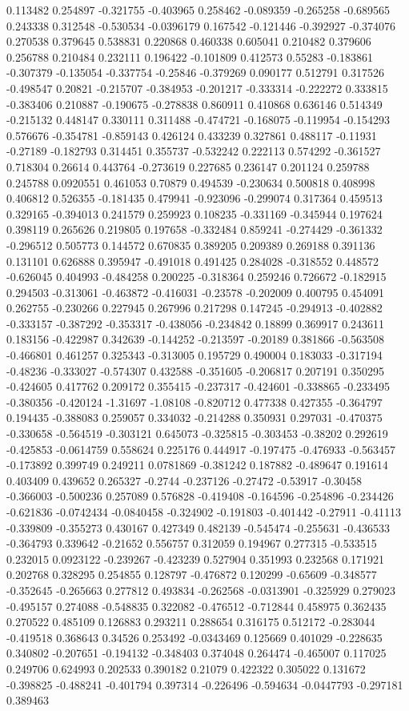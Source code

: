 0.113482 0.254897 -0.321755 -0.403965 0.258462 -0.089359 -0.265258 -0.689565 0.243338 0.312548 -0.530534 -0.0396179 0.167542 -0.121446 -0.392927 -0.374076 0.270538 0.379645 0.538831 0.220868 0.460338 0.605041 0.210482 0.379606 0.256788 0.210484 0.232111 0.196422 -0.101809 0.412573 0.55283 -0.183861 -0.307379 -0.135054 -0.337754 -0.25846 -0.379269 0.090177 0.512791 0.317526 -0.498547 0.20821 -0.215707 -0.384953 -0.201217 -0.333314 -0.222272 0.333815 -0.383406 0.210887 -0.190675 -0.278838 0.860911 0.410868 0.636146 0.514349 -0.215132 0.448147 0.330111 0.311488 -0.474721 -0.168075 -0.119954 -0.154293 0.576676 -0.354781 -0.859143 0.426124 0.433239 0.327861 0.488117 -0.11931 -0.27189 -0.182793 0.314451 0.355737 -0.532242 0.222113 0.574292 -0.361527 0.718304 0.26614 0.443764 -0.273619 0.227685 0.236147 0.201124 0.259788 0.245788 0.0920551 0.461053 0.70879 0.494539 -0.230634 0.500818 0.408998 0.406812 0.526355 -0.181435 0.479941 -0.923096 -0.299074 0.317364 0.459513 0.329165 -0.394013 0.241579 0.259923 0.108235 -0.331169 -0.345944 0.197624 0.398119 0.265626 0.219805 0.197658 -0.332484 0.859241 -0.274429 -0.361332 -0.296512 0.505773 0.144572 0.670835 0.389205 0.209389 0.269188 0.391136 0.131101 0.626888 0.395947 -0.491018 0.491425 0.284028 -0.318552 0.448572 -0.626045 0.404993 -0.484258 0.200225 -0.318364 0.259246 0.726672 -0.182915 0.294503 -0.313061 -0.463872 -0.416031 -0.23578 -0.202009 0.400795 0.454091 0.262755 -0.230266 0.227945 0.267996 0.217298 0.147245 -0.294913 -0.402882 -0.333157 -0.387292 -0.353317 -0.438056 -0.234842 0.18899 0.369917 0.243611 0.183156 -0.422987 0.342639 -0.144252 -0.213597 -0.20189 0.381866 -0.563508 -0.466801 0.461257 0.325343 -0.313005 0.195729 0.490004 0.183033 -0.317194 -0.48236 -0.333027 -0.574307 0.432588 -0.351605 -0.206817 0.207191 0.350295 -0.424605 0.417762 0.209172 0.355415 -0.237317 -0.424601 -0.338865 -0.233495 -0.380356 -0.420124 -1.31697 -1.08108 -0.820712 0.477338 0.427355 -0.364797 0.194435 -0.388083 0.259057 0.334032 -0.214288 0.350931 0.297031 -0.470375 -0.330658 -0.564519 -0.303121 0.645073 -0.325815 -0.303453 -0.38202 0.292619 -0.425853 -0.0614759 0.558624 0.225176 0.444917 -0.197475 -0.476933 -0.563457 -0.173892 0.399749 0.249211 0.0781869 -0.381242 0.187882 -0.489647 0.191614 0.403409 0.439652 0.265327 -0.2744 -0.237126 -0.27472 -0.53917 -0.30458 -0.366003 -0.500236 0.257089 0.576828 -0.419408 -0.164596 -0.254896 -0.234426 -0.621836 -0.0742434 -0.0840458 -0.324902 -0.191803 -0.401442 -0.27911 -0.41113 -0.339809 -0.355273 0.430167 0.427349 0.482139 -0.545474 -0.255631 -0.436533 -0.364793 0.339642 -0.21652 0.556757 0.312059 0.194967 0.277315 -0.533515 0.232015 0.0923122 -0.239267 -0.423239 0.527904 0.351993 0.232568 0.171921 0.202768 0.328295 0.254855 0.128797 -0.476872 0.120299 -0.65609 -0.348577 -0.352645 -0.265663 0.277812 0.493834 -0.262568 -0.0313901 -0.325929 0.279023 -0.495157 0.274088 -0.548835 0.322082 -0.476512 -0.712844 0.458975 0.362435 0.270522 0.485109 0.126883 0.293211 0.288654 0.316175 0.512172 -0.283044 -0.419518 0.368643 0.34526 0.253492 -0.0343469 0.125669 0.401029 -0.228635 0.340802 -0.207651 -0.194132 -0.348403 0.374048 0.264474 -0.465007 0.117025 0.249706 0.624993 0.202533 0.390182 0.21079 0.422322 0.305022 0.131672 -0.398825 -0.488241 -0.401794 0.397314 -0.226496 -0.594634 -0.0447793 -0.297181 0.389463 